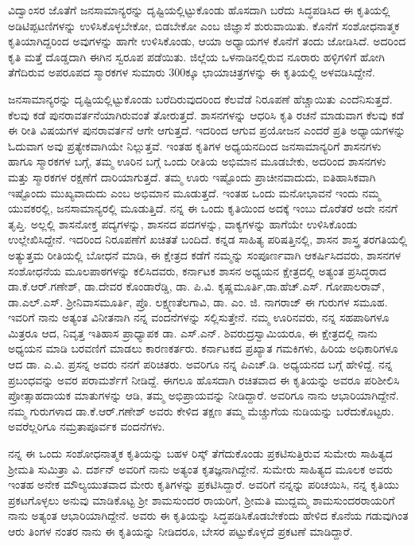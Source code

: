 ವಿದ್ವಾಂಸರ ಜೊತೆಗೆ ಜನಸಾಮಾನ್ಯರನ್ನು ದೃಷ್ಟಿಯಲ್ಲಿಟ್ಟುಕೊಂಡು ಹೊಸದಾಗಿ ಬರೆದು ಸಿದ್ಧಪಡಿಸಿದ ಈ ಕೃತಿಯಲ್ಲಿ ಅಡಿಟಿಪ್ಪಟಣಿಗಳನ್ನು ಉಳಿಸಿಕೊಳ್ಳಬೇಕೋ, ಬಿಡಬೇಕೋ ಎಂಬ ಜಿಜ್ಞಾಸೆ ಶುರುವಾಯಿತು. ಕೊನೆಗೆ ಸಂಶೋಧನಾತ್ಮಕ ಕೃತಿ\-ಯಾಗಿದ್ದರಿಂದ ಅವುಗಳನ್ನು ಹಾಗೇ ಉಳಿಸಿಕೊಂಡು, ಆಯಾ ಅಧ್ಯಾಯಗಳ ಕೊನೆಗೆ ತಂದು ಜೋಡಿಸಿದೆ. ಅದರಿಂದ ಕೃತಿ ಮತ್ತೆ ದೊಡ್ಡದಾಗಿ ಈಗಿನ ಸ್ವರೂಪ ಪಡೆಯಿತು. ಜಿಲ್ಲೆಯ ಒಳನಾಡಿನಲ್ಲಿರುವ ನೂರಾರು ಹಳ್ಳಿಗಳಿಗೆ ಹೋಗಿ ತೆಗೆದಿರುವ ಅಪರೂಪದ ಸ್ಮಾರಕಗಳ ಸುಮಾರು 300ಕ್ಕೂ ಛಾಯಾಚಿತ್ರಗಳನ್ನು ಈ ಕೃತಿಯಲ್ಲಿ ಅಳವಡಿಸಿದ್ದೇನೆ.

ಜನಸಾಮಾನ್ಯರನ್ನು ದೃಷ್ಟಿಯಲ್ಲಿಟ್ಟುಕೊಂಡು ಬರೆದಿರುವುದರಿಂದ ಕೆಲವೆಡೆ ನಿರೂಪಣೆ ಹೆಚ್ಚಾಯಿತು ಎಂದೆನಿಸು\-ತ್ತದೆ. ಕೆಲವು ಕಡೆ ಪುನರಾವರ್ತನೆಯಾಗಿರುವಂತೆ ತೋರುತ್ತದೆ.   ಶಾಸನಗಳನ್ನು ಆಧರಿಸಿ ಕೃತಿ ರಚನೆ ಮಾಡುವಾಗ ಕೆಲವು ಕಡೆ ಈ ರೀತಿ ವಿಷಯಗಳ ಪುನರಾವರ್ತನೆ ಆಗೇ ಆಗುತ್ತದೆ. ಇದರಿಂದ ಆಗುವ ಪ್ರಯೋಜನ ಎಂದರೆ ಪ್ರತಿ ಅಧ್ಯಾಯಗಳನ್ನು ಓದುವಾಗ  ಅವು ಪ್ರತ್ಯೇಕವಾಗಿಯೇ ನಿಲ್ಲುತ್ತವೆ. ಇಂತಹ ಕೃತಿಗಳ ಅಧ್ಯಯನದಿಂದ ಜನಸಾಮಾನ್ಯರಿಗೆ ಶಾಸನಗಳು ಹಾಗೂ ಸ್ಮಾರಕಗಳ ಬಗ್ಗೆ, ತಮ್ಮ ಊರಿನ ಬಗ್ಗೆ ಒಂದು ರೀತಿಯ ಅಭಿಮಾನ ಮೂಡಬೇಕು, ಅದರಿಂದ ಶಾಸನಗಳು ಮತ್ತು ಸ್ಮಾರಕಗಳ ರಕ್ಷಣೆಗೆ ದಾರಿಯಾಗುತ್ತದೆ. ತಮ್ಮ ಊರು ಇಷ್ಟೊಂದು ಪ್ರಾಚೀನವಾದುದು, ಐತಿಹಾಸಿಕವಾಗಿ ಇಷ್ಟೊಂದು ಮುಖ್ಯವಾದುದು ಎಂಬ ಅಭಿಮಾನ ಮೂಡುತ್ತದೆ.  ಇಂತಹ ಒಂದು ಮನೋಭಾವನೆ ಇಂದು ನಮ್ಮ ಯುವಕರಲ್ಲಿ, ಜನಸಾಮಾನ್ಯರಲ್ಲಿ ಮೂಡು\-ತ್ತಿದೆ. ನನ್ನ ಈ ಒಂದು ಕೃತಿಯಿಂದ ಅದಕ್ಕೆ ಇಂಬು ದೊರೆತರೆ ಅದೇ ನನಗೆ ತೃಪ್ತಿ. ಅಲ್ಲಲ್ಲಿ ಶಾಸನೋಕ್ತ ಪದ್ಯಗಳನ್ನು, ಶಾಸನದ ಪದಗಳನ್ನು, ವಾಕ್ಯಗಳನ್ನು ಹಾಗೆಯೇ ಉಳಿಸಿಕೊಂಡು ಉಲ್ಲೇಖಿಸಿದ್ದೇನೆ. ಇದರಿಂದ ನಿರೂಪಣೆಗೆ ಖಚಿತತೆ ಬಂದಿದೆ.  ಕನ್ನಡ ಸಾಹಿತ್ಯ ಪರಿಷತ್ತಿನಲ್ಲಿ,  ಶಾಸನ ಶಾಸ್ತ್ರ ತರಗತಿಯಲ್ಲಿ ಅತ್ಯುತ್ತಮ ರೀತಿಯಲ್ಲಿ ಬೋಧನೆ ಮಾಡಿ, ಈ ಕ್ಷೇತ್ರದ ಕಡೆಗೆ \hbox{ನಮ್ಮನ್ನು} ಸಂಪೂರ್ಣವಾಗಿ ಆಕರ್ಷಿಸಿದವರು, ಶಾಸನಗಳ ಸಂಶೋಧನೆಯ ಮೂಲಪಾಠಗಳನ್ನು ಕಲಿಸಿದವರು, ಕರ್ನಾಟಕ ಶಾಸನ ಅಧ್ಯಯನ ಕ್ಷೇತ್ರದಲ್ಲಿ ಅತ್ಯಂತ ಪ್ರಸಿದ್ಧರಾದ  ಡಾ.ಕೆ.ಆರ್​.ಗಣೇಶ್​, ಡಾ.ದೇವರ ಕೊಂಡಾರೆಡ್ಡಿ, ಡಾ. ಪಿ.ವಿ. ಕೃಷ್ಣಮೂರ್ತಿ,\break ಡಾ.ಹೆಚ್​.ಎಸ್​. ಗೋಪಾಲರಾವ್​, ಡಾ.ಎಲ್​.ಎಸ್​. ಶ್ರೀನಿವಾಸಮೂರ್ತಿ, ಪ್ರೊ. ಲಕ್ಷ್ಮಣತೆಲಗಾವಿ, ಡಾ. ಎಂ. ಜಿ. \hbox{ನಾಗರಾಜ್} ಈ ಗುರುಗಳ ಸಮೂಹ. ಇವರಿಗೆ ನಾನು ಅತ್ಯಂತ ವಿನೀತನಾಗಿ ನನ್ನ ವಂದನೆಗಳನ್ನು ಸಲ್ಲಿಸುತ್ತೇನೆ. ನಮ್ಮ ಊರಿನವರು, ನನ್ನ ಸಹಪಾಠಿಗಳೂ ಮಿತ್ರರೂ ಆದ, ನಿವೃತ್ತ ಇತಿಹಾಸ ಪ್ರಾಧ್ಯಾಪಕ ಡಾ. ಎಸ್​.ಎನ್​. ಶಿವರುದ್ರಸ್ವಾಮಿಯರೂ, ಈ ಕ್ಷೇತ್ರದಲ್ಲಿ ನಾನು ಅಧ್ಯಯನ ಮಾಡಿ ಬರವಣಿಗೆ ಮಾಡಲು ಕಾರಣಕರ್ತರು. ಕರ್ನಾಟಕದ ಪ್ರಖ್ಯಾತ ಗಮಕಿಗಳು, ಹಿರಿಯ ಅಧಿಕಾರಿಗಳೂ ಆದ ಡಾ. ಎ.ವಿ. ಪ್ರಸನ್ನ ಅವರು ನನಗೆ ಪರಿಚಿತರು. ಅವರಿಗೂ ನನ್ನ ಪಿಎಚ್​.ಡಿ. ಅಧ್ಯಯನದ ಬಗ್ಗೆ ಹೇಳಿದ್ದೆ. ನನ್ನ ಪ್ರಬಂಧವನ್ನು ಅವರ ಪರಾಮರ್ಶೆಗೆ ನೀಡಿದ್ದೆ. ಈಗಲೂ ಹೊಸದಾಗಿ ರಚಿತವಾದ ಈ ಕೃತಿಯನ್ನು ಅವರೂ ಪರಿಶೀಲಿಸಿ ಪ್ರೋತ್ಸಾಹದಾಯಕ ಮಾತುಗಳನ್ನು ಆಡಿ, ತಮ್ಮ ಅಭಿಪ್ರಾಯವನ್ನು ನೀಡಿದ್ದಾರೆ. ಅವರಿಗೂ ನಾನು ಆಭಾರಿಯಾಗಿದ್ದೇನೆ. ನಮ್ಮ ಗುರುಗಳಾದ ಡಾ.ಕೆ.ಆರ್​.ಗಣೇಶ್​ ಅವರು ಕೇಳಿದ ತಕ್ಷಣ ತಮ್ಮ ಮೆಚ್ಚುಗೆಯ ನುಡಿಯನ್ನು ಬರೆದು\-ಕೊಟ್ಟರು. ಅವರೆಲ್ಲರಿಗೂ ನಮ್ರತಾಪೂರ್ವಕ ವಂದನೆಗಳು.

ನನ್ನ ಈ ಒಂದು ಸಂಶೋಧನಾತ್ಮಕ ಕೃತಿಯನ್ನು ಬಹಳ ರಿಸ್ಕ್​ ತೆಗೆದುಕೊಂಡು ಪ್ರಕಟಿಸುತ್ತಿರುವ ಸುಮೇರು ಸಾಹಿತ್ಯದ ಶ್ರೀಮತಿ ಸುಮಿತ್ರಾ ವಿ. ದರ್ಶನ್​ ಅವರಿಗೆ ನಾನು ಅತ್ಯಂತ ಕೃತಜ್ಞನಾಗಿದ್ದೇನೆ. ಸುಮೇರು ಸಾಹಿತ್ಯದ ಮೂಲಕ ಅವರು ಇಂತಹ ಅನೇಕ ಮೌಲ್ಯಯುತವಾದ ಮೇರು ಕೃತಿಗಳನ್ನು ಪ್ರಕಟಿಸಿದ್ದಾರೆ.  ಅವರಿಗೆ ನನ್ನನ್ನು ಪರಿಚಯಿಸಿ, ನನ್ನ ಕೃತಿಯು ಪ್ರಕಟ\-ಗೊಳ್ಳಲು ಅನುವು ಮಾಡಿಕೊಟ್ಟ ಶ್ರೀ ಶಾಮಸುಂದರ ರಾಯರಿಗೆ, ಶ್ರೀಮತಿ ಮುದ್ದಮ್ಮ ಶಾಮಸುಂದರರಾಯರಿಗೆ ನಾನು ಅತ್ಯಂತ ಆಭಾರಿಯಾಗಿದ್ದೇನೆ. ಅವರು ಈ ಕೃತಿಯನ್ನು ಸಿದ್ಧಪಡಿಸಿಕೊಡಬೇಕೆಂದು ಹೇಳಿದ ಕೊನೆಯ ಗಡುವುಗಿಂತ ಆರು ತಿಂಗಳ ನಂತರ ನಾನು ಈ ಕೃತಿಯನ್ನು ನೀಡಿದರೂ, ಬೇಸರ ಪಟ್ಟುಕೊಳ್ಳದೆ ಪ್ರಕಟಣೆ ಮಾಡಿದ್ದಾರೆ.

